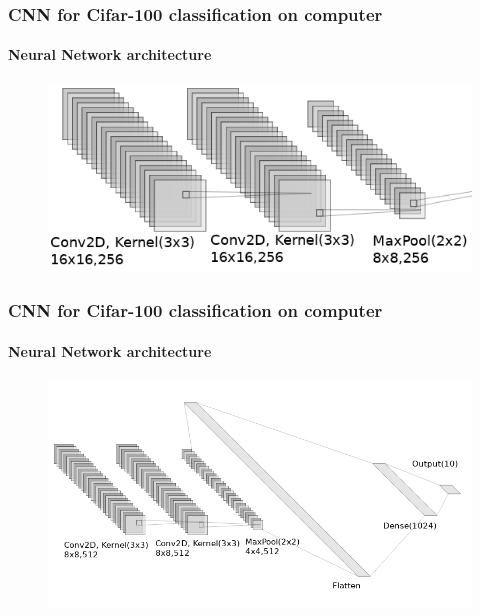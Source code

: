\documentclass{beamer}
\begin{document}
\begin{frame}
\frametitle{CNN for Cifar-100 classification on computer}
\framesubtitle{Neural Network architecture}
\begin{figure}
	\centering
	\includegraphics[scale=0.4]{pictures/Cifar_100/cnn2}
\end{figure}
\end{frame}

\begin{frame}
\frametitle{CNN for Cifar-100 classification on computer}
\framesubtitle{Neural Network architecture}
\begin{figure}
	\centering
	\includegraphics[scale=0.4]{pictures/Cifar_100/cnn3}
\end{figure}
\end{frame}
\end{document}
